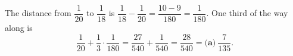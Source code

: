 The distance from $\dfrac{1}{20}$ to $\dfrac{1}{18}$ is $\dfrac{1}{18}-\dfrac{1}{20}=\dfrac{10-9}{180}=\dfrac{1}{180}$. One third of the way along is
\[
\dfrac{1}{20}+\dfrac{1}{3}\cdot\dfrac{1}{180}=\dfrac{27}{540}+\dfrac{1}{540}=\dfrac{28}{540}=\boxed{\textbf{(a)}\ \dfrac{7}{135}} .
\]
